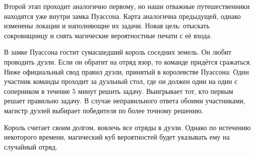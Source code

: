\documentclass[a4paper,12pt]{article}
\begin{document}
Второй этап проходит аналогично первому, но наши отважные путешественники находятся уже внутри замка Пуассона. Карта аналогична предыдущей, однако изменены локации и наполняющие их задачи. Новая цель: отыскать сокровищницу и снять магические вероятностные печати с её входа.  

В замке Пуассона гостит сумасшедший король соседних земель. Он любит проводить дуэли. Если он обратит на отряд взор, то команде придётся сражаться. Ниже официальный свод правил дуэли, принятый в королевстве Пуассона: 
Один участник команды проходит за дуэльный стол, где он должен один на один с соперником в течение 5 минут решить задачу. Выигрывает тот, кто первым решает правильно задачу. В случае неправильного ответа обоими участниками, магистр дуэлей выбирает победителя по более точному решению.


Король считает своим долгом, вовлечь все отряды в дуэли. Однако по истечению некоторого времени, магический куб вероятностей будет указывать ему на случайный отряд.
\end{document}
